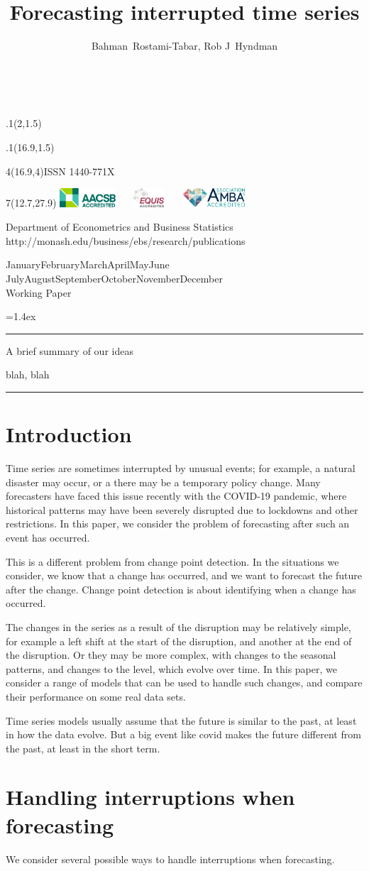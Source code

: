 \documentclass[11pt,a4paper,]{article}
\title{Forecasting interrupted time series}
\author{Bahman~Rostami-Tabar, Rob J~Hyndman}
\date{\sf\Date~\Month~\Year}
\makeatletter
\def\Date{\number\day}
\def\Month{\ifcase\month\or
 January\or February\or March\or April\or May\or June\or
 July\or August\or September\or October\or November\or December\fi}
\def\Year{\number\year}
\def\showjel{{\large\textsf{\textbf{JEL classification:}}~\@jel}}
\def\cover{{\sffamily\setcounter{page}{0}
        \thispagestyle{empty}
        \placefig{2}{1.5}{width=5cm}{_extensions/numbats/wp/monash2}
        \placefig{16.9}{1.5}{width=2.1cm}{_extensions/numbats/wp/MBSportrait}
        \begin{textblock}{4}(16.9,4)ISSN 1440-771X\end{textblock}
        \begin{textblock}{7}(12.7,27.9)\hfill
        \includegraphics[height=0.7cm]{_extensions/numbats/wp/AACSB}~~~
        \includegraphics[height=0.7cm]{_extensions/numbats/wp/EQUIS}~~~
        \includegraphics[height=0.7cm]{_extensions/numbats/wp/AMBA}
        \end{textblock}
        \vspace*{2cm}
        \begin{center}\Large
        Department of Econometrics and Business Statistics\\[.5cm]
        \footnotesize http://monash.edu/business/ebs/research/publications
        \end{center}\vspace{2cm}
        \begin{center}
        \fbox{\parbox{14cm}{\begin{onehalfspace}\centering\Huge\vspace*{0.3cm}
                \textsf{\textbf{\expandafter{\@title}}}\vspace{1cm}\par
                \LARGE\@author\end{onehalfspace}
        }}
        \end{center}
        \vfill
                \begin{center}\Large
                \Month~\Year\\[1cm]
                Working Paper \@wp
        \end{center}\vspace*{2cm}}}
\def\pageone{{\sffamily\setstretch{1}%
        \thispagestyle{empty}%
        \vbox to \textheight{%
        \raggedright\baselineskip=1.2cm
     {\fontsize{24.88}{30}\sffamily\textbf{\expandafter{\@title}}}
        \vspace{2cm}\par
        \hspace{1cm}\parbox{14cm}{\sffamily\large\@addresses}\vspace{1cm}\vfill
        \hspace{1cm}{\large\Date~\Month~\Year}\\[1cm]
        \hspace{1cm}\showjel\vss}}}
\def\blindtitle{{\sffamily
     \thispagestyle{plain}\raggedright\baselineskip=1.2cm
     {\fontsize{24.88}{30}\sffamily\textbf{\expandafter{\@title}}}\vspace{1cm}\par
        }}
\def\titlepage{{\cover\newpage\pageone\newpage\blindtitle}}
\let\maketitle\titlepage
\newenvironment{keywords}{\par\vspace{0.5cm}\noindent{\sffamily\textbf{Keywords:}}}{\vspace{0.25cm}\par\hrule\vspace{0.5cm}\par}
\renewenvironment{abstract}{\begin{minipage}{\textwidth}\parskip=1.4ex\noindent
\hrule\vspace{0.1cm}\par{\sffamily\textbf{\abstractname}}\newline}
  {\end{minipage}}
\def\placefig#1#2#3#4{\begin{textblock}{.1}(#1,#2)\rlap{\texttt{[image: \#4]}}\end{textblock}}
\makeatother
\begin{document}
\maketitle
\begin{abstract}
A brief summary of our ideas
\end{abstract}
\begin{keywords}
blah, blah
\end{keywords}

\hypertarget{introduction}{%
\section{Introduction}\label{introduction}}

Time series are sometimes interrupted by unusual events; for example, a
natural disaster may occur, or a there may be a temporary policy change.
Many forecasters have faced this issue recently with the COVID-19
pandemic, where historical patterns may have been severely disrupted due
to lockdowns and other restrictions. In this paper, we consider the
problem of forecasting after such an event has occurred.

This is a different problem from change point detection. In the
situations we consider, we know that a change has occurred, and we want
to forecast the future after the change. Change point detection is about
identifying when a change has occurred.

The changes in the series as a result of the disruption may be
relatively simple, for example a left shift at the start of the
disruption, and another at the end of the disruption. Or they may be
more complex, with changes to the seasonal patterns, and changes to the
level, which evolve over time. In this paper, we consider a range of
models that can be used to handle such changes, and compare their
performance on some real data sets.

Time series models usually assume that the future is similar to the
past, at least in how the data evolve. But a big event like covid makes
the future different from the past, at least in the short term.

\hypertarget{handling-interruptions-when-forecasting}{%
\section{Handling interruptions when
forecasting}\label{handling-interruptions-when-forecasting}}

We consider several possible ways to handle interruptions when
forecasting.
\end{document}
